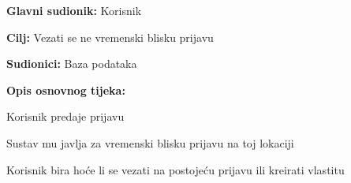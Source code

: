					\noindent {}
					\begin{packed_item}
	
						\item \textbf{Glavni sudionik: }Korisnik
						\item  \textbf{Cilj:} Vezati se ne vremenski blisku prijavu
						\item  \textbf{Sudionici:} Baza podataka
						\item  \textbf{Opis osnovnog tijeka:}
						
						\item[] \begin{packed_enum}
	
							\item Korisnik predaje prijavu
							\item Sustav mu javlja za vremenski blisku prijavu na toj lokaciji
							\item Korisnik bira hoće li se vezati na postojeću prijavu ili kreirati vlastitu
						\end{packed_enum}
					\end{packed_item}
					
					\pagebreak
					
